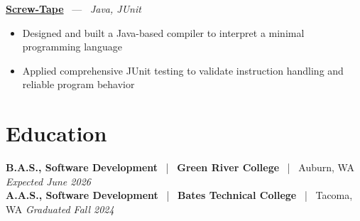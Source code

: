 \documentclass[10pt, letterpaper]{article}
\newcommand{\jobhead}[4]{%
  \vspace{5pt}%
  {\bfseries\color{dark}#1}%
  ~{\color{light}|}~%
  {\bfseries\color{navy}#2}%
  ~{\color{light}|}~%
  {\color{light}#3}%
  \hfill{\color{light}\small\textit{#4}}\\[-2pt]%
}
\newcommand{\projhead}[3]{%
  \vspace{5pt}%
  {\bfseries\color{dark}\href{#2}{#1}}%
  ~{\color{light}---}~%
  {\color{light}\small\textit{#3}}\\[-2pt]%
}
\begin{document}
\projhead{Screw-Tape}{https://github.com/timmyd4/screwtape}{Java, JUnit}
\begin{itemize}
  \item Designed and built a Java-based compiler to interpret a minimal programming language
  \item Applied comprehensive JUnit testing to validate instruction handling and reliable program behavior
\end{itemize}

\section{Education}

\jobhead{B.A.S., Software Development}{Green River College}{Auburn, WA}{Expected June 2026}
\jobhead{A.A.S., Software Development}{Bates Technical College}{Tacoma, WA}{Graduated Fall 2024}
\end{document}
